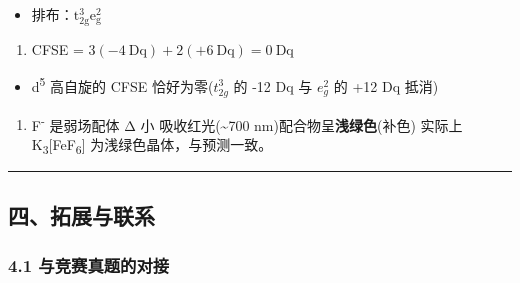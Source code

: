 \begin{itemize}
\tightlist
\item
  排布：\(\mathrm{t_{2g}^3 e_g^2}\)
\end{itemize}

\begin{enumerate}
\def\labelenumi{(\arabic{enumi})}
\setcounter{enumi}{2}
\tightlist
\item
  CFSE = \(3(-4\ \mathrm{Dq}) + 2(+6\ \mathrm{Dq}) = 0\ \mathrm{Dq}\)
\end{enumerate}

\begin{itemize}
\tightlist
\item
  d\textsuperscript{5} 高自旋的 CFSE 恰好为零(\(t_{2g}^3\) 的 -12 Dq 与 \(e_g^2\) 的 +12 Dq 抵消)
\end{itemize}

\begin{enumerate}
\def\labelenumi{(\arabic{enumi})}
\setcounter{enumi}{3}
\tightlist
\item
  F\textsuperscript{-} 是弱场配体 \箭 Δ 小 \箭 吸收红光(\textasciitilde700 nm)\箭 配合物呈\textbf{浅绿色}(补色)
  实际上 K\textsubscript{3}{[}FeF\textsubscript{6}{]} 为浅绿色晶体，与预测一致。
\end{enumerate}

\begin{center}\rule{0.5\linewidth}{0.5pt}\end{center}

\subsection{四、拓展与联系}\label{ux56dbux62d3ux5c55ux4e0eux8054ux7cfb}

\subsubsection{4.1 与竞赛真题的对接}\label{ux4e0eux7adeux8d5bux771fux9898ux7684ux5bf9ux63a5}

